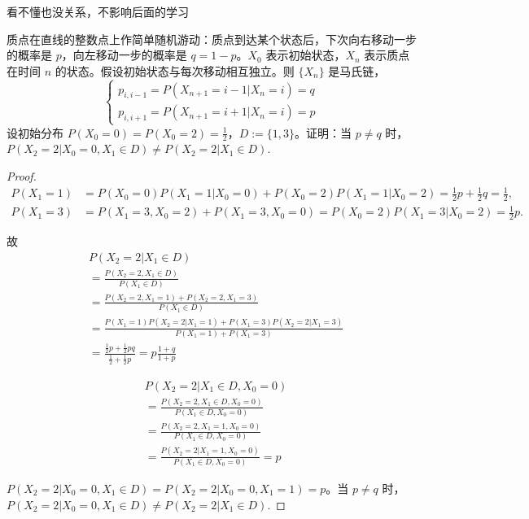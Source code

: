 \documentclass[lang=cn,10pt,thmcnt=section]{elegantbook}
\begin{document}
\begin{remark}
	看不懂也没关系，不影响后面的学习
\end{remark}
\begin{example}
	质点在直线的整数点上作简单随机游动：质点到达某个状态后，下次向右移动一步的概率是 $p$，向左移动一步的概率是 $q = 1 - p$。$X_0$ 表示初始状态，$X_n$ 表示质点在时间 $n$ 的状态。假设初始状态与每次移动相互独立。则 $\{X_n\}$ 是马氏链，
\[
\begin{cases}
p_{i, i-1} = P(X_{n+1} = i - 1 | X_n = i) = q \\
p_{i, i+1} = P(X_{n+1} = i + 1 | X_n = i) = p
\end{cases}
\]
设初始分布 $P(X_0 = 0) = P(X_0 = 2) = \frac{1}{2}$，$D := \{1, 3\}$。证明：当 $p \neq q$ 时，$P(X_2 = 2 | X_0 = 0, X_1 \in D) \neq P(X_2 = 2 | X_1 \in D)$.
\end{example}
\begin{proof}
	\[
\begin{aligned}
P(X_1 = 1) &= P(X_0 = 0)P(X_1 = 1 | X_0 = 0) + P(X_0 = 2)P(X_1 = 1 | X_0 = 2) = \frac{1}{2}p + \frac{1}{2}q = \frac{1}{2}, \\
P(X_1 = 3) &= P(X_1 = 3, X_0 = 2) + P(X_1 = 3, X_0 = 0) = P(X_0 = 2)P(X_1 = 3 | X_0 = 2) = \frac{1}{2}p.
\end{aligned}
\]

故
\[
\begin{aligned}
& P(X_2 = 2 | X_1 \in D) \\
& = \frac{P(X_2 = 2, X_1 \in D)}{P(X_1 \in D)} \\
& = \frac{P(X_2 = 2, X_1 = 1) + P(X_2 = 2, X_1 = 3)}{P(X_1 \in D)} \\
& = \frac{P(X_1 = 1)P(X_2 = 2 | X_1 = 1) + P(X_1 = 3)P(X_2 = 2 | X_1 = 3)}{P(X_1 = 1) + P(X_1 = 3)} \\
& = \frac{\frac{1}{2}p + \frac{1}{2}pq}{\frac{1}{2} + \frac{1}{2}p} = p\frac{1 + q}{1 + p}
\end{aligned}
\]

\[
\begin{aligned}
& P(X_2 = 2 | X_1 \in D, X_0 = 0) \\
& = \frac{P(X_2 = 2, X_1 \in D, X_0 = 0)}{P(X_1 \in D, X_0 = 0)} \\
& = \frac{P(X_2 = 2, X_1 = 1, X_0 = 0)}{P(X_1 \in D, X_0 = 0)} \\
& = \frac{P(X_2 = 2 | X_1 = 1, X_0 = 0)}{P(X_1 \in D, X_0 = 0)} = p
\end{aligned}
\]

$P(X_2 = 2 | X_0 = 0, X_1 \in D) = P(X_2 = 2 | X_0 = 0, X_1 = 1) = p$。当 $p \neq q$ 时，$P(X_2 = 2 | X_0 = 0, X_1 \in D) \neq P(X_2 = 2 | X_1 \in D)$.

\end{proof}
\end{document}
